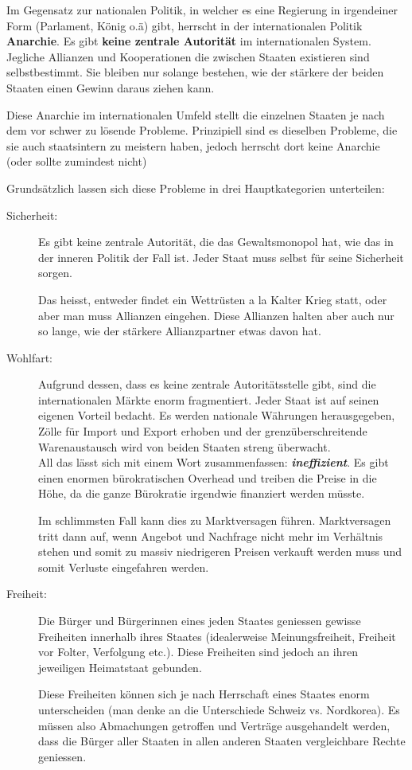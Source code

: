 \documentclass[a4paper, 11pt]{article}
\begin{document}
Im Gegensatz zur nationalen Politik, in welcher es eine Regierung in irgendeiner Form (Parlament, König o.ä) gibt, herrscht in der internationalen Politik \textbf{Anarchie}. Es gibt \textbf{keine zentrale Autorität} im internationalen System. Jegliche Allianzen und Kooperationen die zwischen Staaten existieren sind selbstbestimmt. Sie bleiben nur solange bestehen, wie der stärkere der beiden Staaten einen Gewinn daraus ziehen kann.

Diese Anarchie im internationalen Umfeld stellt die einzelnen Staaten je nach dem vor schwer zu lösende Probleme. Prinzipiell sind es dieselben Probleme, die sie auch staatsintern zu meistern haben, jedoch herrscht dort keine Anarchie (oder sollte zumindest nicht)

Grundsätzlich lassen sich diese Probleme in drei Hauptkategorien unterteilen:


\begin{description}
	\item[Sicherheit: ] Es gibt keine zentrale Autorität, die das Gewaltsmonopol hat, wie das in der inneren Politik der Fall ist. Jeder Staat muss selbst für seine Sicherheit sorgen.
	
	
	Das heisst, entweder findet ein Wettrüsten a la Kalter Krieg statt, oder aber man muss Allianzen eingehen. Diese Allianzen halten aber auch nur so lange, wie der stärkere Allianzpartner etwas davon hat.
	\item[Wohlfart: ] Aufgrund dessen, dass es keine zentrale Autoritätsstelle 	gibt, sind die internationalen Märkte enorm fragmentiert. Jeder Staat ist auf seinen eigenen Vorteil bedacht. Es werden nationale Währungen herausgegeben, Zölle für Import und Export erhoben und der grenzüberschreitende Warenaustausch wird von beiden Staaten streng überwacht. \\
	All das lässt sich mit einem Wort zusammenfassen: \textit{\textbf{ineffizient}}. Es gibt einen enormen bürokratischen Overhead und treiben die Preise in die Höhe, da die ganze Bürokratie irgendwie finanziert werden müsste.
	
	
	Im schlimmsten Fall kann dies zu Marktversagen führen. Marktversagen tritt dann auf, wenn Angebot und Nachfrage nicht mehr im Verhältnis stehen und somit zu massiv niedrigeren Preisen verkauft werden muss und somit Verluste eingefahren werden.
	
	\item[Freiheit: ] Die Bürger und Bürgerinnen eines jeden Staates geniessen gewisse Freiheiten innerhalb ihres Staates (idealerweise Meinungsfreiheit, Freiheit vor Folter, Verfolgung etc.). Diese Freiheiten sind jedoch an ihren jeweiligen Heimatstaat gebunden.
	
	
	Diese Freiheiten können sich je nach Herrschaft eines Staates enorm unterscheiden (man denke an die Unterschiede Schweiz vs. Nordkorea). Es müssen also Abmachungen getroffen und Verträge ausgehandelt werden, dass die Bürger aller Staaten in allen anderen Staaten vergleichbare Rechte geniessen.
\end{description}
\end{document}
